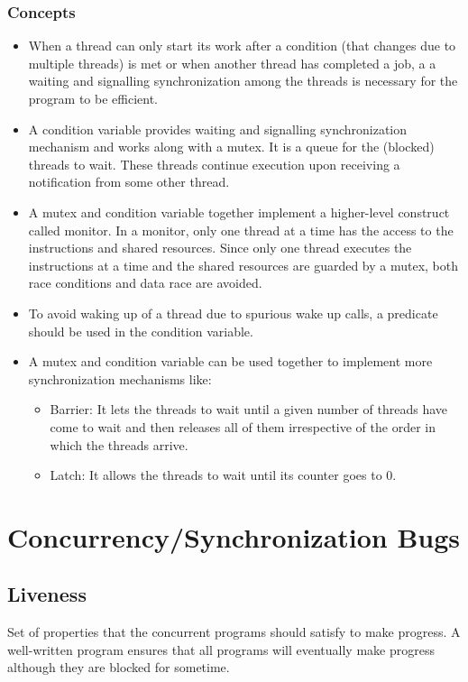 \documentclass{scrartcl}
\begin{document}
\subsubsection{Concepts}

\begin{itemize}
\item When a thread can only start its work after a condition (that changes due to multiple threads) is met or when another thread has completed a job, a a waiting and signalling synchronization among the threads is necessary for the program to be efficient.
\item A condition variable provides waiting and signalling synchronization mechanism and works along with a mutex. It is a queue for the (blocked) threads to wait. These threads continue execution upon receiving a notification from some other thread.
\item A mutex and condition variable together implement a higher-level construct called monitor. In a monitor, only one thread at a time has the access to the instructions and shared resources. Since only one thread executes the instructions at a time and the shared resources are guarded by a mutex, both race conditions and data race are avoided.
\item To avoid waking up of a thread due to spurious wake up calls, a predicate should be used in the condition variable.
\item A mutex and condition variable can be used together to implement more synchronization mechanisms like:
\begin{itemize}
\item Barrier: It lets the threads to wait until a given number of threads have come to wait and then releases all of them irrespective of the order in which the threads arrive.
\item Latch: It allows the threads to wait until its counter goes to 0.
\end{itemize}
\end{itemize}

\section{Concurrency/Synchronization Bugs}

\subsection{Liveness}
Set of properties that the concurrent programs should satisfy to make progress. A well-written program ensures that all programs will eventually make progress although they are blocked for sometime.
\end{document}
